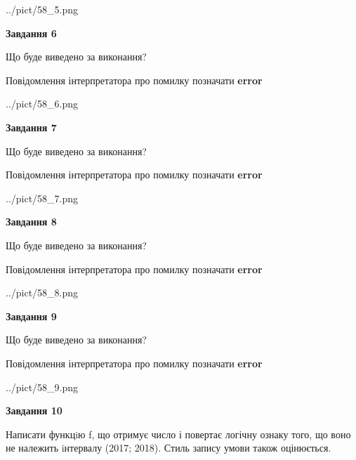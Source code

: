 \documentclass[12pt, ukrainian]{article}
\begin{document}
{\begin {large}
\begin{center}
	{../pict/58_5.png}
\end{center}
\newpage

{\begin {center}\textbf{Завдання 6}\end {center}}\par
Що буде виведено за виконання? \par
Повідомлення інтерпретатора про помилку позначати \textbf{error}

\begin{center}
	{../pict/58_6.png}
\end{center}
\newpage

{\begin {center}\textbf{Завдання 7}\end {center}}\par
Що буде виведено за виконання? \par
Повідомлення інтерпретатора про помилку позначати \textbf{error}

\begin{center}
	{../pict/58_7.png}
\end{center}
\newpage

{\begin {center}\textbf{Завдання 8}\end {center}}\par
Що буде виведено за виконання? \par
Повідомлення інтерпретатора про помилку позначати \textbf{error}

\begin{center}
	{../pict/58_8.png}
\end{center}
\newpage

{\begin {center}\textbf{Завдання 9}\end {center}}\par
Що буде виведено за виконання? \par
Повідомлення інтерпретатора про помилку позначати \textbf{error}

\begin{center}
	{../pict/58_9.png}
\end{center}
\newpage

{\begin {center}\textbf{Завдання 10}\end {center}}\par

Написати функцiю f, що отримує число і повертає логічну ознаку того, що воно не належить iнтервалу (2017; 2018). Стиль запису умови також оцінюється.\par
\newpage

\end {large}}
\end{document}
